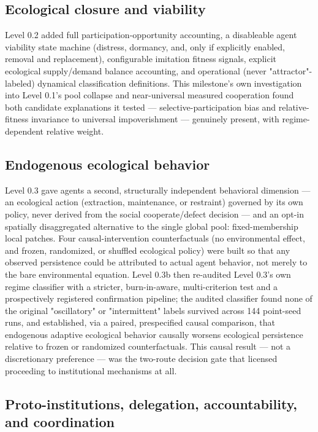 \subsection{Ecological closure and viability}
\label{sec:ecological-closure}

Level 0.2 added full participation-opportunity accounting, a disableable
agent viability state machine (distress, dormancy, and, only if
explicitly enabled, removal and replacement), configurable imitation
fitness signals, explicit ecological supply/demand balance accounting, and
operational (never "attractor"-labeled) dynamical classification
definitions. This milestone's own investigation into Level 0.1's pool
collapse and near-universal measured cooperation found both candidate
explanations it tested --- selective-participation bias and
relative-fitness invariance to universal impoverishment --- genuinely
present, with regime-dependent relative weight.

\subsection{Endogenous ecological behavior}
\label{sec:endogenous-ecology}

Level 0.3 gave agents a second, structurally independent behavioral
dimension --- an ecological action (extraction, maintenance, or restraint)
governed by its own policy, never derived from the social
cooperate/defect decision --- and an opt-in spatially disaggregated
alternative to the single global pool: fixed-membership local patches.
Four causal-intervention counterfactuals (no environmental effect, and
frozen, randomized, or shuffled ecological policy) were built so that any
observed persistence could be attributed to actual agent behavior, not
merely to the bare environmental equation. Level 0.3b then re-audited Level
0.3's own regime classifier with a stricter, burn-in-aware, multi-criterion
test and a prospectively registered confirmation pipeline; the audited
classifier found none of the original "oscillatory" or "intermittent"
labels survived across 144 point-seed runs, and established, via a
paired, prespecified causal comparison, that endogenous adaptive
ecological behavior causally worsens ecological persistence relative to
frozen or randomized counterfactuals. This causal result --- not a
discretionary preference --- was the two-route decision gate that licensed
proceeding to institutional mechanisms at all.

\subsection{Proto-institutions, delegation, accountability, and coordination}
\label{sec:proto-institutions}

